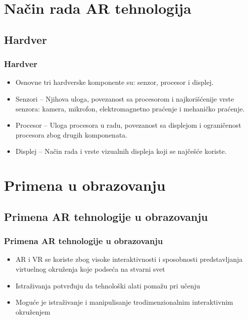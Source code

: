 \documentclass[9pt]{beamer}
\begin{document}
\section{Način rada AR tehnologija}
\subsection{Hardver}
	\begin{frame}
 \frametitle{Hardver}
        \begin{itemize}
            \setlength\itemsep{1.5em}
                \item Osnovne tri hardverske komponente su: senzor, procesor i displej.
                \item Senzori – Njihova uloga, povezanost sa procesorom i najkorišćenije vrste senzora: kamera, mikrofon, elektromagnetno praćenje i mehaničko 			praćenje.
                \item Procesor – Uloga procesora u radu, povezanost sa displejom i ograničenost procesora zbog drugih komponenata.
                \item Displej – Način rada i vrste vizualnih displeja koji se najčešće koriste.
        \end{itemize}
            
	\end{frame}



 
\section{Primena u obrazovanju}
\subsection{Primena AR  tehnologije u obrazovanju}
	\begin{frame} 
 \frametitle{Primena AR  tehnologije u obrazovanju}
    \begin{itemize}
    \setlength\itemsep{1.5em}
            \item AR i VR se koriste zbog visoke interaktivnosti i sposobnosti predstavljanja virtuelnog okruženja koje podseća na stvarni svet
            \item Istraživanja potvrđuju da tehnološki alati pomažu pri učenju
            \item Moguće je istraživanje i manipulisanje trodimenzionalnim interaktivnim okruženjem 
    \end{itemize}
 
	\end{frame}
\end{document}

